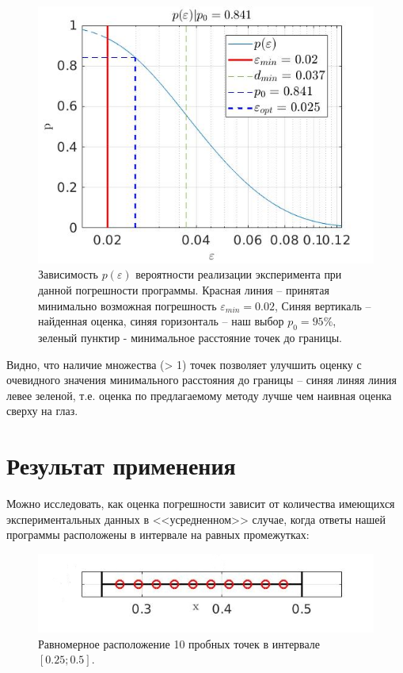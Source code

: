 \documentclass[a4paper,12pt]{article} %
\begin{document}
\begin{figure}[h!]
\begin{center}
\includegraphics[width=1\textwidth]{./pics/vis}
\end{center}
\caption{Зависимость $p(\varepsilon)$ вероятности реализации эксперимента при данной погрешности программы. Красная линия -- принятая минимально возможная погрешность $\varepsilon_{min} = 0.02$, Синяя вертикаль -- найденная оценка, синяя горизонталь -- наш выбор $p_0 = 95\%$, зеленый пунктир - минимальное расстояние точек до границы.}
\label{img:vis}
\end{figure}

Видно, что наличие множества (> 1) точек позволяет улучшить оценку с очевидного значения минимального расстояния до границы -- синяя линяя линия левее зеленой, т.е. оценка по предлагаемому методу лучше чем наивная оценка сверху на глаз.

\newpage

\section{Результат применения}

Можно исследовать, как оценка погрешности зависит от количества имеющихся экспериментальных данных в <<усредненном>> случае, когда ответы нашей программы расположены в интервале на равных промежутках:

\begin{figure}[h!]
\begin{center}
\includegraphics[width=1\textwidth]{./pics/uni_line}
\end{center}
\caption{Равномерное расположение 10 пробных точек в интервале $[0.25; 0.5]$.} \label{img:uni_line}
\end{figure}
\end{document}
